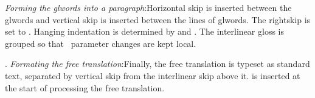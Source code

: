 \smallskip

{\it Forming the glwords into a paragraph}:\enspace Horizontal skip
 is inserted between the glwords and vertical skip
 is inserted between the lines of glwords.   The
rightskip is set to .  Hanging indentation is
determined by  and .  The
interlinear gloss is grouped so that \Tex\ parameter changes are kept
local.

\endgroup
\smallskip
{}. {\it Formating the free translation}:\enspace Finally,
the free translation is typeset as standard text, separated by
vertical skip  from the interlinear skip above
it.   is inserted at the start of processing the
free translation.

\resetatcatcode

\endinput


\hsize=5in

\immediate\openout0=tempfile
\newtoks\stoks
\obeylines
\stoks={\begingl
\glpreamble Mary ist sicher, dass es den Hans nicht st\"oren w\"urde
seiner Freundin ihr Herz auszusch\"utten.//
\gla Mary$_i$ ist sicher, dass es den Hans nicht st\"oren w\"urde
seiner Freundin ihr$_i$ Herz auszusch\"utten.//
\glb Mary is sure that it the-{\sc acc} Hans not annoy would
his-{\sc dat} girlfriend-{\sc dat} her-{\sc acc} heart-{\sc acc} {out to
throw}//
\glft  `Mary is sure that it would not annoy John to reveal her
heart to his girlfriend.'//
\endgl}%
\immediate\write0{\the\stoks}
\immediate\closeout0

\expandafter\codedisplay
|endcodedisplay








\endinput
\makeatletter

\newdimen\ep@cascadeindent
\newdimen\ep@hangindentamount
\newcount\ep@cascadecount

\ep@cascadecount=10
\ep@cascadeindent=0pt
\ep@hangindentamount=\ling@glhangindent

